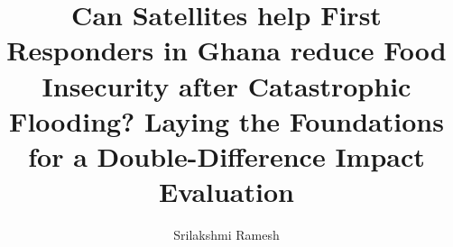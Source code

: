 \documentclass[masters]{ucbthesis}
\begin{document}

\title{Can Satellites help First Responders in Ghana reduce Food Insecurity after Catastrophic Flooding? Laying the Foundations for a Double-Difference Impact Evaluation}
\author{Srilakshmi Ramesh}


\maketitle

% 
\end{document}
